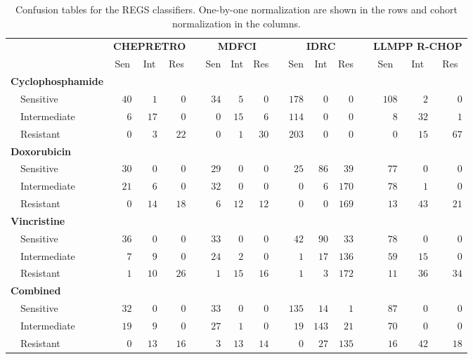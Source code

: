 \begin{table}[!tbp]
{\small
\caption{Confusion tables for the REGS classifiers.
One-by-one normalization are shown in the rows and cohort normalization in the
columns.\label{tab:confusiondrugonebyone}} 
\begin{center}
\begin{tabular}{lrrrcrrrcrrrcrrr}
\hline\hline
\multicolumn{1}{l}{\bfseries }&\multicolumn{3}{c}{\bfseries CHEPRETRO}&\multicolumn{1}{c}{\bfseries }&\multicolumn{3}{c}{\bfseries MDFCI}&\multicolumn{1}{c}{\bfseries }&\multicolumn{3}{c}{\bfseries IDRC}&\multicolumn{1}{c}{\bfseries }&\multicolumn{3}{c}{\bfseries LLMPP R-CHOP}\tabularnewline
\cline{2-4} \cline{6-8} \cline{10-12} \cline{14-16}
\multicolumn{1}{l}{}&\multicolumn{1}{c}{Sen}&\multicolumn{1}{c}{Int}&\multicolumn{1}{c}{Res}&\multicolumn{1}{c}{}&\multicolumn{1}{c}{Sen}&\multicolumn{1}{c}{Int}&\multicolumn{1}{c}{Res}&\multicolumn{1}{c}{}&\multicolumn{1}{c}{Sen}&\multicolumn{1}{c}{Int}&\multicolumn{1}{c}{Res}&\multicolumn{1}{c}{}&\multicolumn{1}{c}{Sen}&\multicolumn{1}{c}{Int}&\multicolumn{1}{c}{Res}\tabularnewline
\hline
{\bfseries Cyclophosphamide}&&&&&&&&&&&&&&&\tabularnewline
~~Sensitive&$40$&$ 1$&$ 0$&&$34$&$ 5$&$ 0$&&$178$&$  0$&$  0$&&$108$&$ 2$&$ 0$\tabularnewline
~~Intermediate&$ 6$&$17$&$ 0$&&$ 0$&$15$&$ 6$&&$114$&$  0$&$  0$&&$  8$&$32$&$ 1$\tabularnewline
~~Resistant&$ 0$&$ 3$&$22$&&$ 0$&$ 1$&$30$&&$203$&$  0$&$  0$&&$  0$&$15$&$67$\tabularnewline
\hline
{\bfseries Doxorubicin}&&&&&&&&&&&&&&&\tabularnewline
~~Sensitive&$30$&$ 0$&$ 0$&&$29$&$ 0$&$ 0$&&$ 25$&$ 86$&$ 39$&&$ 77$&$ 0$&$ 0$\tabularnewline
~~Intermediate&$21$&$ 6$&$ 0$&&$32$&$ 0$&$ 0$&&$  0$&$  6$&$170$&&$ 78$&$ 1$&$ 0$\tabularnewline
~~Resistant&$ 0$&$14$&$18$&&$ 6$&$12$&$12$&&$  0$&$  0$&$169$&&$ 13$&$43$&$21$\tabularnewline
\hline
{\bfseries Vincristine}&&&&&&&&&&&&&&&\tabularnewline
~~Sensitive&$36$&$ 0$&$ 0$&&$33$&$ 0$&$ 0$&&$ 42$&$ 90$&$ 33$&&$ 78$&$ 0$&$ 0$\tabularnewline
~~Intermediate&$ 7$&$ 9$&$ 0$&&$24$&$ 2$&$ 0$&&$  1$&$ 17$&$136$&&$ 59$&$15$&$ 0$\tabularnewline
~~Resistant&$ 1$&$10$&$26$&&$ 1$&$15$&$16$&&$  1$&$  3$&$172$&&$ 11$&$36$&$34$\tabularnewline
\hline
{\bfseries Combined}&&&&&&&&&&&&&&&\tabularnewline
~~Sensitive&$32$&$ 0$&$ 0$&&$33$&$ 0$&$ 0$&&$135$&$ 14$&$  1$&&$ 87$&$ 0$&$ 0$\tabularnewline
~~Intermediate&$19$&$ 9$&$ 0$&&$27$&$ 1$&$ 0$&&$ 19$&$143$&$ 21$&&$ 70$&$ 0$&$ 0$\tabularnewline
~~Resistant&$ 0$&$13$&$16$&&$ 3$&$13$&$14$&&$  0$&$ 27$&$135$&&$ 16$&$42$&$18$\tabularnewline
\hline
\end{tabular}\end{center}}

\end{table}
